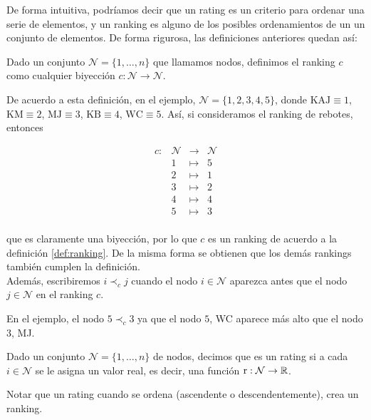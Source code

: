 De forma intuitiva, podríamos decir que un rating es un criterio para ordenar una serie de elementos, y un ranking es alguno de los posibles ordenamientos de un un conjunto de elementos. De forma rigurosa, las definiciones anteriores quedan así:

\begin{defi} \label{def:ranking}
Dado un conjunto $\mathcal{N} = \{1,\dots,n\}$ que llamamos nodos, definimos el ranking $c$ como cualquier biyección $c : \mathcal{N} \to \mathcal{N}$.
\end{defi}

De acuerdo a esta definición, en el ejemplo, $\mathcal{N} = \{1,2,3,4,5\}$, donde $\text{KAJ}\equiv 1$, $\text{KM}\equiv 2$, $\text{MJ}\equiv 3$, $\text{KB}\equiv 4$, $\text{WC}\equiv 5$. Así, si consideramos el ranking de rebotes, entonces

\[ \begin{array}{rlll}
c: & \mathcal{N} & \to & \mathcal{N}\\
& 1 & \mapsto & 5\\
& 2 & \mapsto & 1\\
& 3 & \mapsto & 2\\
& 4 & \mapsto & 4\\
& 5 & \mapsto & 3\\
\end{array} \] 

que es claramente una biyección, por lo que $c$ es un ranking de acuerdo a la definición \ref{def:ranking}. De la misma forma se obtienen que los demás rankings también cumplen la definición.\\

Además, escribiremos $i \prec_c j$ cuando el nodo $i \in \mathcal{N}$ aparezca antes que el nodo $j \in \mathcal{N}$ en el ranking $c$.

\begin{ejemplo}
En el ejemplo, el nodo $5 \prec_c 3$ ya que el nodo $5$, WC aparece más alto que el nodo $3$, MJ.
\end{ejemplo}

\begin{defi}
Dado un conjunto $\mathcal{N} = \{1,\dots, n\}$ de nodos, decimos que es un rating si a cada $i \in \mathcal{N}$ se le asigna un valor real, es decir, una función $\mathrm{r} : \mathcal{N} \to \mathbb{R}$.
\end{defi}

Notar que un rating cuando se ordena (ascendente o descendentemente), crea un ranking.\\

